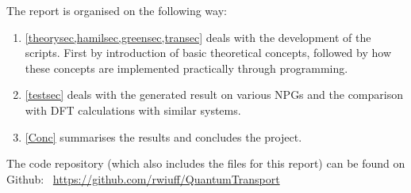 The report is organised on the following way:
\begin{enumerate}
	\item \cref{theorysec,hamilsec,greensec,transec} deals with the development of the scripts. First by introduction of basic theoretical concepts, followed by how these concepts are implemented practically through programming.
	\item \cref{testsec} deals with the generated result on various NPGs and the comparison with DFT calculations with similar systems.
	\item \cref{Conc} summarises the results and concludes the project.
\end{enumerate}
The code repository (which also includes the \latex files for this report) can be found on Github: \faGithub \ \url{https://github.com/rwiuff/QuantumTransport}
